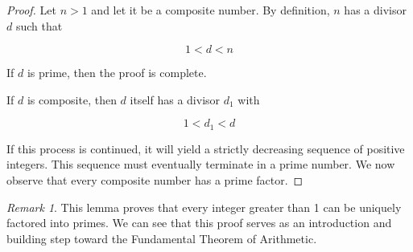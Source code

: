 \documentclass{article}
\theoremstyle{plain}
\theoremstyle{definition}
\theoremstyle{remark}
\newtheorem{remark}{Remark}
\begin{document}
\begin{proof} 
    Let \(n > 1\) and let it be a composite number. By definition, \(n\) has a divisor \(d\) such that
    
    \[
        1 < d < n
    \]
    
    If \(d\) is prime, then the proof is complete. 

    If \(d\) is composite, then \(d\) itself has a divisor \(d_1\) with

    \[
        1 < d_1 < d
    \]

    If this process is continued, it will yield a strictly decreasing sequence of positive integers. This sequence must eventually terminate in a prime number. We now observe that every composite number has a prime factor.
 \end{proof}

\begin{remark} 
    This lemma proves that every integer greater than 1 can be uniquely factored into primes. We can see that this proof serves as an introduction and building step toward the Fundamental Theorem of Arithmetic.
\end{remark}
\end{document}
